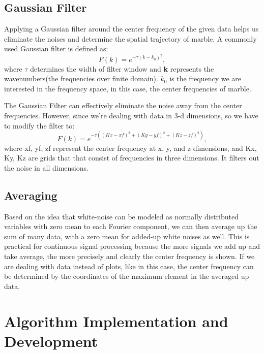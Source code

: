 \documentclass[10pt]{article}
\begin{document}
\subsection{Gaussian Filter}
Applying a Gaussian filter around the center frequency of the given data helps us eliminate the noises and determine the spatial trajectory of marble. A commonly used Gaussian filter is defined as:
\begin{equation}\label{3}
F(k) = e^{-\tau(k - k_0)^2},
\end{equation}
where ${\tau}$ determines the width of filter window and \textbf{k} represents the wavenumbers(the frequencies over finite domain). $k_0$ is the frequency we are interested in the frequency space, in this case, the center frequencies of marble. \par
\vskip 0.5cm
The Gaussian Filter can effectively eliminate the noise away from the center frequencies. However, since we're dealing with data in 3-d dimensions, so we have to modify the filter to:
\begin{equation}\label{4}
F(k) = e^{-\tau((Kx - xf)^2 + (Ky - yf)^2 + (Kz - zf)^2)},
\end{equation}
where xf, yf, zf represent the center frequency at x, y, and z dimensions, and Kx, Ky, Kz are grids that that consist of frequencies in three dimensions. It filters out the noise in all dimensions.

\subsection{Averaging}
Based on the idea that white-noise can be modeled as normally distributed variables with zero mean to each Fourier component, we can then average up the sum of many data, with a zero mean for added-up white noises as well. This is practical for continuous signal processing because the more signals we add up and take average, the more precisely and clearly the center frequency is shown. If we are dealing with data instead of plots, like in this case, the center frequency can be determined by the coordinates of the maximum element in the averaged up data.

\section{Algorithm Implementation and Development}
\end{document}

